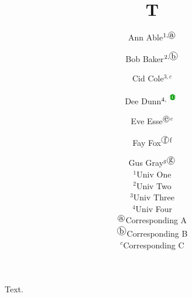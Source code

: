 \documentclass{article}
\title{T}
\author{Ann Able$^{1,\circled{a}}$ \and Bob Baker$^{2,\circled{b}}$ \and Cid Cole$^{3,\boxed{c}}$
  \and Dee Dunn$^{4,\orcidicon}$ \and Eve Esse$^{\circled{e}}$$^{e}$ \and Fay Fox$^{\circled{f}}$\textsuperscript{f}
  \and Gus Gray$^{g}$$^{\circled{g}}$\\ $^{1}$Univ One\\ $^{2}$Univ Two\\ $^{3}$Univ Three\\ $^{4}$Univ Four\\
  $^{\circled{a}}$Corresponding A\\ $^{\circled{b}}$Corresponding B\\ $^{\boxed{c}}$Corresponding C}
\begin{document}
\maketitle
Text.
\end{document}
